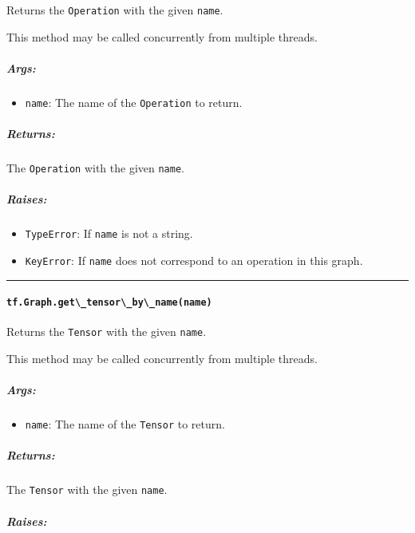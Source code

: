 Returns the \lstinline{Operation} with the given \lstinline{name}.

This method may be called concurrently from multiple threads.

\subparagraph{Args: }\label{args-7}

\begin{itemize}
\tightlist
\item
  \lstinline{name}: The name of the \lstinline{Operation} to return.
\end{itemize}

\subparagraph{Returns: }\label{returns-7}

The \lstinline{Operation} with the given \lstinline{name}.

\subparagraph{Raises: }\label{raises-2}

\begin{itemize}
\tightlist
\item
  \lstinline{TypeError}: If \lstinline{name} is not a string.
\item
  \lstinline{KeyError}: If \lstinline{name} does not correspond to an
  operation in this graph.
\end{itemize}

\begin{center}\rule{0.5\linewidth}{\linethickness}\end{center}

\paragraph{\texorpdfstring{\lstinline{tf.Graph.get\_tensor\_by\_name(name)}
}{tf.Graph.get\_tensor\_by\_name(name) }}\label{tf.graph.getux5ftensorux5fbyux5fnamename}

Returns the \lstinline{Tensor} with the given \lstinline{name}.

This method may be called concurrently from multiple threads.

\subparagraph{Args: }\label{args-8}

\begin{itemize}
\tightlist
\item
  \lstinline{name}: The name of the \lstinline{Tensor} to return.
\end{itemize}

\subparagraph{Returns: }\label{returns-8}

The \lstinline{Tensor} with the given \lstinline{name}.

\subparagraph{Raises: }\label{raises-3}

